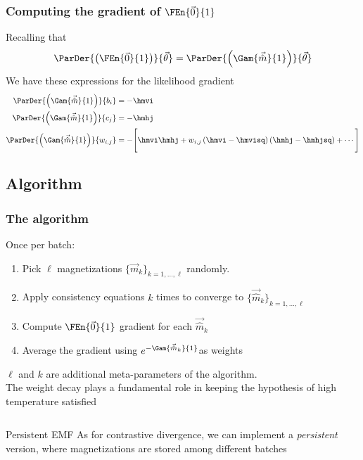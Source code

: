 \begin{frame}
  \frametitle{Computing the gradient of \(\FEn{\vec{0}}{1}\)}
  Recalling that
  \[
  \ParDer{\left(\FEn{\vec{0}}{1}\right)}{\vec{\theta}} =
  \ParDer{\left(\Gam{\vec{\hat{m}}}{1}\right)}{\vec{\theta}}
  \]  
  We  have these expressions for the  likelihood gradient
  \begin{align*}
    \ParDer{\left(\Gam{\vec{\hat{m}}}{1}\right)}{b_i} &= -\hmvi\\
    \ParDer{\left(\Gam{\vec{\hat{m}}}{1}\right)}{c_j} &= -\hmhj\\
    \ParDer{\left(\Gam{\vec{\hat{m}}}{1}\right)}{w_{i,j}}
    &=-\Bigg[\hmvi\hmhj +w_{i,j}\left(\hmvi-\hmvisq\right)\left(\hmhj-\hmhjsq\right)+ \cdots \Bigg]
  \end{align*}
\end{frame}


\subsection{Algorithm}
\begin{frame}
  \frametitle{The algorithm}
  Once per batch:
  \begin{enumerate}
    \item Pick \(\ell\) magnetizations \(\{\vec{m}_k\}_{k=1,\dots,\ell}\) randomly.
    \item Apply consistency equations \(k\) times to converge to \(\{\vec{\hat{m}}_k\}_{k=1,\dots,\ell}\)
    \item Compute \(\FEn{\vec{0}}{1}\) gradient for each \(\vec{\hat{m}}_k\)
    \item Average the gradient using \(e^{-\Gam{\vec{\hat{m}}_k}{1}}\)as weights
  \end{enumerate}
	\pause
  \(\ell\) and \(k\) are additional meta-parameters of the algorithm.\\
  \pause
  The \alert{weight decay} plays a fundamental role in keeping  the hypothesis of high temperature satisfied
  \pause
  \begin{columns}
     \begin{alertblock}{Persistent EMF}
       As for contrastive divergence, we can implement a \emph{persistent} version, where magnetizations are stored among different batches
     \end{alertblock}
  \end{columns}
\end{frame}


















